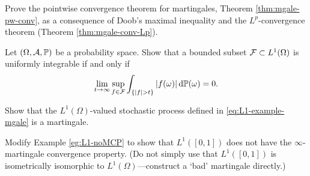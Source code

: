 \begin{exercise}\label{ex:mgale-conv}
  Prove the pointwise convergence theorem for martingales, Theorem \ref{thm:mgale-pw-conv}, as a consequence of Doob's maximal inequality and the $L^p$-convergence theorem (Theorem \ref{thm:mgale-conv-Lp}).
\end{exercise}

\begin{exercise}\label{ex:UI-characterisation}
  Let $(\Omega,\mathcal{A},\mathbb{P})$ be a probability space.
  Show that a bounded subset $\mathcal{F} \subset L^1(\Omega)$ is uniformly integrable if and only if
  \begin{equation*}
    \lim_{t \to \infty} \sup_{f \in \mathcal{F}} \int_{\{|f| > t\}} |f(\omega)| \, \mathrm{d}\mathbb{P}(\omega) = 0.
  \end{equation*}
\end{exercise}

\begin{exercise}\label{ex:mgale-check}
  Show that the $L^1(\Omega)$-valued stochastic process defined in \eqref{eq:L1-example-mgale} is a martingale. 
\end{exercise}

\begin{exercise}\label{ex:L1-noMCP-var}
  Modify Example \ref{eg:L1-noMCP} to show that $L^1([0,1])$ does not have the $\infty$-martingale convergence property. (Do not simply use that $L^1([0,1])$ is isometrically isomorphic to $L^1(\Omega)$---construct a `bad' martingale directly.)
\end{exercise}




